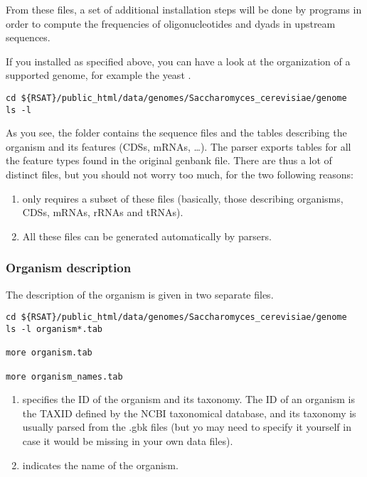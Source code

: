 From these files, a set of additional installation steps will be done
by \RSAT programs in order to compute the frequencies of
oligonucleotides and dyads in upstream sequences.

If you installed \RSAT as specified above, you can have a look at the
organization of a supported genome, for example the yeast
.

\begin{footnotesize}
\begin{verbatim}
cd ${RSAT}/public_html/data/genomes/Saccharomyces_cerevisiae/genome
ls -l
\end{verbatim}
\end{footnotesize}

As you see, the folder  contains the sequence files and
the tables describing the organism and its features (CDSs, mRNAs,
\ldots). The \RSAT parser exports tables for all the feature types
found in the original genbank file. There are thus a lot of distinct
files, but you should not worry too much, for the two following
reasons:
\begin{enumerate}
\item \RSAT only requires a subset of these files (basically, those
  describing organisms, CDSs, mRNAs, rRNAs and tRNAs).
\item All these files can be generated automatically by \RSAT parsers.
\end{enumerate}

\subsubsection{Organism description} 

The description of the organism is given in two separate files.


\begin{footnotesize}
\begin{verbatim}
cd ${RSAT}/public_html/data/genomes/Saccharomyces_cerevisiae/genome
ls -l organism*.tab

more organism.tab

more organism_names.tab
\end{verbatim}
\end{footnotesize}

\begin{enumerate}
\item {} specifies the ID of the organism and its
  taxonomy. The ID of an organism is the TAXID defined by the NCBI
  taxonomical database, and its taxonomy is usually parsed from the
  .gbk files (but yo may need to specify it yourself in case it would
  be missing in your own data files).

\item {} indicates the name of the organism.
\end{enumerate}


